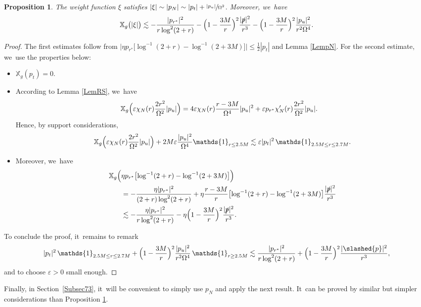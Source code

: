 \documentclass[10pt]{amsart}
\let\epsilon\varepsilon
\theoremstyle{plain}
\newtheorem{proposition}{Proposition}[section]
\theoremstyle{definition}
\newcommand\T{{\mathbb{X}}}
\begin{document}
\begin{proposition}\label{Promultiplierm}
The weight function $\xi$ satisfies $|\xi| \sim |p_N| \sim |p_t|+\sfrac{|p_u|}{\Omega^2}$. Moreover, we~have
\[
\T_g \bigl(|\xi| \bigr) \lesssim -\frac{|p_{r^*}|^2}{r \log^2(2+r)}-\Bigl(1-\frac{3M}{r} \Bigr)^2 \frac{|\slashed{p}|^2}{r^3} -\Bigl(1-\frac{3M}{r} \Bigr)^2\frac{|p_u|^2}{r^2\Omega^4}.
\]
\end{proposition}
\begin{proof}
The first estimates follow from $\big|\eta p_{r^*} \bigl[ \log^{-1}(2+r) -\log^{-1}(2+3M) \bigr]\big| \leq \frac{1}{2}|p_t|$ and Lemma \ref{LempN}. For the second estimate, we~use the properties below:
\begin{itemize}
\item $\T_g(p_t)=0$.
\item According to Lemma \ref{LemRS}, we~have
\begin{align*}
\T_g \Bigl(\epsilon \chi_N (r) \frac{2r^2}{\Omega^2} |p_u| \Bigr) & = 4\epsilon \chi_N(r)\frac{r-3M}{\Omega^4}|p_u|^2 +\epsilon p_{r^*} \chi'_N(r) \frac{2r^2}{\Omega^2} |p_u|.
\end{align*}
Hence, by support considerations,
\[
\T_g \Bigl(\epsilon \chi_N (r) \frac{2r^2}{\Omega^2} |p_u| \Bigr) + 2M \epsilon \frac{|p_u|^2}{\Omega^4} \mathds{1}_{r \leq 2.5M} \lesssim \epsilon |p_t|^2 \, \mathds{1}_{2.5M \leq r \leq 2.7M}.
\]
\item Moreover, we~have
\begin{align*}
\nonumber \T_g \Bigl(&\eta p_{r^*} \bigl[ \log^{-1}(2+r) -\log^{-1}(2+3M) \bigr] \Bigr)\\
& =-\frac{ \eta |p_{r^*}|^2}{(2+r) \log^2(2+r)}+\eta \frac{r-3M}{r}\bigl[ \log^{-1}(2+r) -\log^{-1}(2+3M) \bigr] \frac{|\slashed{p}|^2}{r^3} \nonumber\\
& \lesssim -\frac{ \eta |p_{r^*}|^2}{r \log^2(2+r)}- \eta \Bigl(1-\frac{3M}{r} \Bigr)^2 \frac{|\slashed{p}|^2}{r^3}.%
\end{align*}
\end{itemize}
To conclude the proof, it~remains to remark
\[
|p_t|^2 \, \mathds{1}_{2.5M \leq r \leq 2.7M} + \Bigl(1-\frac{3M}{r} \Bigr)^2 \frac{|p_u|^2}{r^2\Omega^4} \, \mathds{1}_{r \geq 2.5M} \lesssim \frac{ |p_{r^*}|^2}{r \log^2(2+r)}+ \Bigl(1-\frac{3M}{r} \Bigr)^2 \frac{|\slashed{p}|^2}{r^3},
\]
and to choose $\epsilon>0 $ small enough.
\end{proof}

Finally, in Section~\ref{Subsec73}, it~will be convenient to simply use $p_N$ and apply the next result. It~can be proved by similar but simpler considerations than Proposition \ref{Promultiplierm}.
\end{document}
